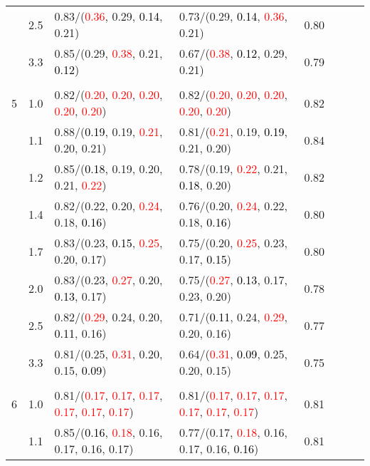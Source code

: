 \documentclass[10pt,a4paper]{report}
\begin{document}
\begin{table}[!htbp]
\begin{center}
{\begin{tabular}{ccllcccc}
			&2.5&0.83/(\textcolor{red}{0.36}, 0.29, \textcolor{black}{0.14}, 0.21)&0.73/(0.29, \textcolor{black}{0.14}, \textcolor{red}{0.36}, 0.21)&0.80\\
			&3.3&0.85/(0.29, \textcolor{red}{0.38}, 0.21, \textcolor{black}{0.12})&0.67/(\textcolor{red}{0.38}, \textcolor{black}{0.12}, 0.29, 0.21)&0.79\\
			&&&&\\
			5			&1.0&0.82/(\textcolor{red}{0.20}, \textcolor{red}{0.20}, \textcolor{red}{0.20}, \textcolor{red}{0.20}, \textcolor{red}{0.20})&0.82/(\textcolor{red}{0.20}, \textcolor{red}{0.20}, \textcolor{red}{0.20}, \textcolor{red}{0.20}, \textcolor{red}{0.20})&0.82\\
			&1.1&0.88/(\textcolor{black}{0.19}, 0.19, \textcolor{red}{0.21}, 0.20, 0.21)&0.81/(\textcolor{red}{0.21}, 0.19, \textcolor{black}{0.19}, 0.21, 0.20)&0.84\\
			&1.2&0.85/(\textcolor{black}{0.18}, 0.19, 0.20, 0.21, \textcolor{red}{0.22})&0.78/(0.19, \textcolor{red}{0.22}, 0.21, \textcolor{black}{0.18}, 0.20)&0.82\\
			&1.4&0.82/(0.22, 0.20, \textcolor{red}{0.24}, 0.18, \textcolor{black}{0.16})&0.76/(0.20, \textcolor{red}{0.24}, 0.22, 0.18, \textcolor{black}{0.16})&0.80\\
			&1.7&0.83/(0.23, \textcolor{black}{0.15}, \textcolor{red}{0.25}, 0.20, 0.17)&0.75/(0.20, \textcolor{red}{0.25}, 0.23, 0.17, \textcolor{black}{0.15})&0.80\\
			&2.0&0.83/(0.23, \textcolor{red}{0.27}, 0.20, \textcolor{black}{0.13}, 0.17)&0.75/(\textcolor{red}{0.27}, \textcolor{black}{0.13}, 0.17, 0.23, 0.20)&0.78\\
			&2.5&0.82/(\textcolor{red}{0.29}, 0.24, 0.20, \textcolor{black}{0.11}, 0.16)&0.71/(\textcolor{black}{0.11}, 0.24, \textcolor{red}{0.29}, 0.20, 0.16)&0.77\\
			&3.3&0.81/(0.25, \textcolor{red}{0.31}, 0.20, 0.15, \textcolor{black}{0.09})&0.64/(\textcolor{red}{0.31}, \textcolor{black}{0.09}, 0.25, 0.20, 0.15)&0.75\\
			&&&&\\
			6			&1.0&0.81/(\textcolor{red}{0.17}, \textcolor{red}{0.17}, \textcolor{red}{0.17}, \textcolor{red}{0.17}, \textcolor{red}{0.17}, \textcolor{red}{0.17})&0.81/(\textcolor{red}{0.17}, \textcolor{red}{0.17}, \textcolor{red}{0.17}, \textcolor{red}{0.17}, \textcolor{red}{0.17}, \textcolor{red}{0.17})&0.81\\
			&1.1&0.85/(\textcolor{black}{0.16}, \textcolor{red}{0.18}, 0.16, 0.17, 0.16, 0.17)&0.77/(0.17, \textcolor{red}{0.18}, 0.16, 0.17, 0.16, \textcolor{black}{0.16})&0.81\\

\end{tabular}}
\end{center}
\end{table}
\end{document}
